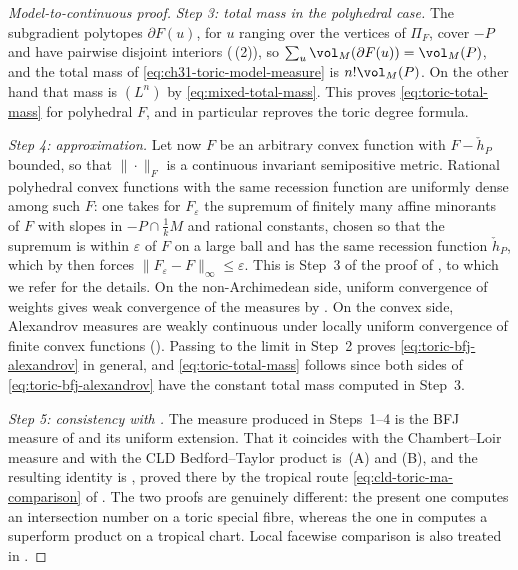 \begin{proof}[Model-to-continuous proof]
\emph{Step 3: total mass in the polyhedral case.}  The subgradient
polytopes \(\partial F(u)\), for \(u\) ranging over the vertices of
\(\Pi_F\), cover \(-P\) and have pairwise disjoint interiors
(\,(2)), so
\(\sum_u\vol_M(\partial F(u))=\vol_M(P)\), and the total mass of
\eqref{eq:ch31-toric-model-measure} is \(n!\vol_M(P)\).  On the other hand
that mass is \((L^n)\) by \eqref{eq:mixed-total-mass}.  This proves
\eqref{eq:toric-total-mass} for polyhedral \(F\), and in particular
reproves the toric degree formula.

\emph{Step 4: approximation.}  Let now \(F\) be an arbitrary convex function
with \(F-\check h_P\) bounded, so that \(\|\cdot\|_F\) is a continuous
invariant semipositive metric.  Rational polyhedral convex functions with
the same recession function are uniformly dense among such \(F\): one takes
for \(F_\varepsilon\) the supremum of finitely many affine minorants of
\(F\) with slopes in \(-P\cap\tfrac1kM\) and rational constants, chosen so
that the supremum is within \(\varepsilon\) of \(F\) on a large ball and has
the same recession function \(\check h_P\), which by
 then forces
\(\|F_\varepsilon-F\|_\infty\leq\varepsilon\).  This is Step~3 of the proof
of , to which we refer for the details.  On the
non-Archimedean side,
uniform convergence of weights gives weak convergence of the measures by
.  On the convex side, Alexandrov
measures are weakly continuous under locally uniform convergence of finite
convex functions ().  Passing to the limit
in Step~2 proves \eqref{eq:toric-bfj-alexandrov} in general, and
\eqref{eq:toric-total-mass} follows since both sides of
\eqref{eq:toric-bfj-alexandrov} have the constant total mass computed in
Step~3.

\emph{Step 5: consistency with .}  The measure produced in
Steps~1--4 is the BFJ measure of  and its
uniform extension.  That it coincides with the Chambert--Loir measure and
with the CLD Bedford--Taylor product is
\,(A) and (B), and the resulting identity
is , proved there by the tropical route
\eqref{eq:cld-toric-ma-comparison} of \cite[Theorem~6.1.1]{BGJKK25}.  The
two proofs are genuinely different: the present one computes an
intersection number on a toric special fibre, whereas the one in
 computes a superform product on a tropical chart.
Local facewise comparison is also treated in \cite{Vil20}.
\end{proof}

